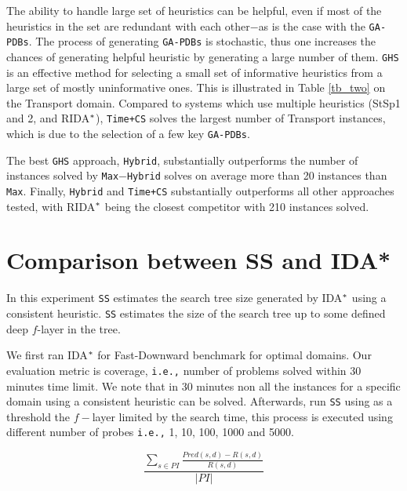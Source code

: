 The ability to handle large set of heuristics can be helpful, even if most of the heuristics in the set are redundant with each other$-$as is the case with the \texttt{GA-PDBs}. The process of generating \texttt{GA-PDBs} is stochastic, thus one increases the chances of generating helpful heuristic by generating a large number of them. \texttt{GHS} is an effective method for selecting a small set of informative heuristics from a large set of mostly uninformative ones. This is illustrated in Table \ref{tb_two} on the Transport domain. Compared to systems which use multiple heuristics (StSp1 and 2, and RIDA$\sp{*}$), \texttt{Time+CS} solves the largest number of Transport instances, which is due to the selection of a few key \texttt{GA-PDBs}.

The best \texttt{GHS} approach, \texttt{Hybrid}, substantially outperforms the number of instances solved by \texttt{Max$-$Hybrid} solves on average more than 20 instances than \texttt{Max}. Finally, \texttt{Hybrid} and \texttt{Time+CS} substantially outperforms all other approaches tested, with RIDA$\sp{*}$ being the closest competitor with 210 instances solved.

\section{Comparison between SS and IDA*}
\noindent
In this experiment \texttt{SS} estimates the search tree size generated by IDA$\sp{*}$ using a consistent heuristic. \texttt{SS} estimates the size of the search tree up to some defined deep $f$-layer in the tree.

We first ran IDA$\sp{*}$ for Fast-Downward benchmark for optimal domains. Our evaluation metric is coverage, \texttt{i.e.,} number of problems solved within 30 minutes time limit. We note that in 30 minutes non all the instances for a specific domain using a consistent heuristic can be solved. Afterwards, run \texttt{SS} using as a threshold the $f-$layer limited by the search time, this process is executed using different number of probes \texttt{i.e.,} 1, 10, 100, 1000 and 5000.

\begin{equation}
\frac{\sum_{s\in PI} \frac{Pred(s, d) - R(s, d)}{R(s, d)}}{|PI|}
\label{eq:eq_comparison}
\end{equation}

